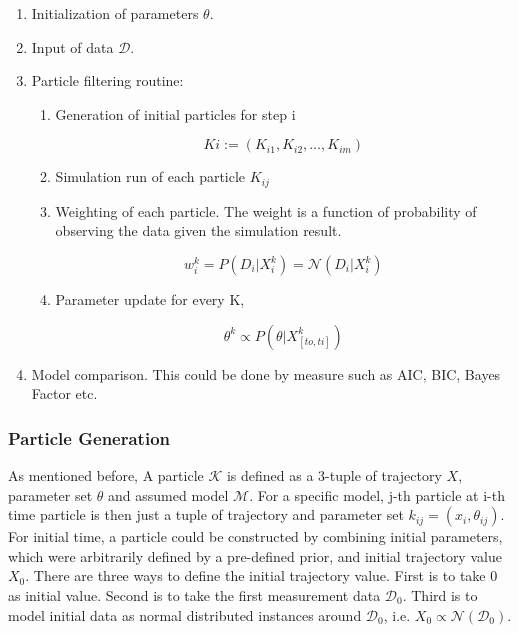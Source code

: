 \documentclass[12pt, oneside]{article}
\begin{document}
\begin{enumerate}
\item Initialization of parameters $\theta$.
\item Input of data $\mathcal{D}$.
\item Particle filtering routine:

\begin{enumerate}
\item Generation of initial particles for step i

$$Ki := (K_{i1}, K_{i2}, \dots, K_{im})$$

\item Simulation run of each particle $K_{ij}$
\item Weighting of each particle. The weight is a function of probability of observing the data given the simulation result.

$$w_i^k = P(D_i | X_i^k) = \mathcal{N}(D_i | X_i^k)$$

\item Parameter update for every K,

$$\theta^k \propto P(\theta | X^k_{[to, ti]})$$
\end{enumerate}

\item Model comparison. This could be done by measure such as AIC, BIC, Bayes Factor etc.

\end{enumerate}

\subsubsection{Particle Generation}

As mentioned before, A particle $\mathcal{K}$ is defined as a 3-tuple of trajectory $X$, parameter set $\theta$ and assumed model $\mathcal{M}$. For a specific model, j-th particle at i-th time particle is then just a tuple of trajectory and parameter set $k_{ij} = (x_i, \theta_{ij})$.\\

For initial time, a particle could be constructed by combining initial parameters, which were arbitrarily defined by a pre-defined prior, and initial trajectory value $X_0$. There are three ways to define the initial trajectory value. First is to take 0 as initial value. Second is to take the first measurement data $\mathcal{D}_0$. Third is to model initial data as normal distributed instances around $\mathcal{D}_0$, i.e. $X_0 \propto \mathcal{N}(\mathcal{D}_0)$.\\
\end{document}
